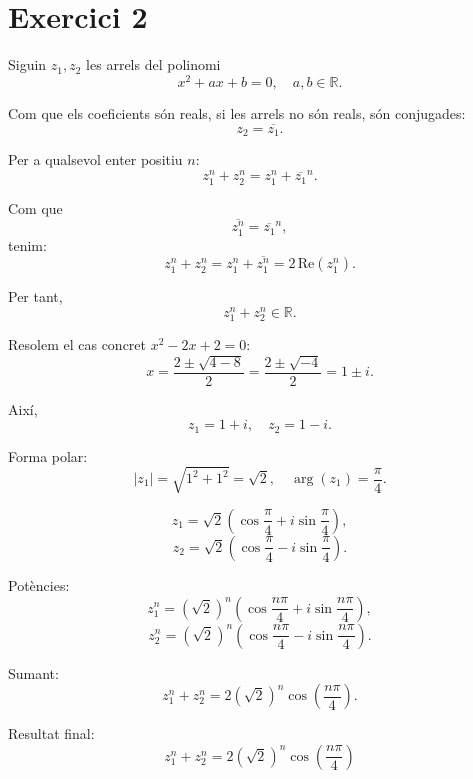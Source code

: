 \section{Exercici 2}
Siguin $z_1, z_2$ les arrels del polinomi
\[
x^2 + ax + b = 0, \quad a,b \in \mathbb{R}.
\]

Com que els coeficients són reals, si les arrels no són reals, són conjugades:
\[
z_2 = \overline{z_1}.
\]

Per a qualsevol enter positiu $n$:
\[
z_1^n + z_2^n = z_1^n + \overline{z_1}^n.
\]

Com que
\[
\overline{z_1^n} = \overline{z_1}^n,
\]
tenim:
\[
z_1^n + z_2^n = z_1^n + \overline{z_1^n} = 2 \,\mathrm{Re}(z_1^n).
\]

Per tant,
\[
z_1^n + z_2^n \in \mathbb{R}.
\]

Resolem el cas concret $x^2 - 2x + 2 = 0$:
\[
x = \frac{2 \pm \sqrt{4 - 8}}{2} = \frac{2 \pm \sqrt{-4}}{2} = 1 \pm i.
\]

Així,
\[
z_1 = 1+i, \quad z_2 = 1-i.
\]

Forma polar:
\[
|z_1| = \sqrt{1^2 + 1^2} = \sqrt{2}, \quad \arg(z_1) = \frac{\pi}{4}.
\]

\[
z_1 = \sqrt{2}\left(\cos \frac{\pi}{4} + i \sin \frac{\pi}{4}\right),
\]
\[
z_2 = \sqrt{2}\left(\cos \frac{\pi}{4} - i \sin \frac{\pi}{4}\right).
\]

Potències:
\[
z_1^n = (\sqrt{2})^n \left(\cos \frac{n\pi}{4} + i \sin \frac{n\pi}{4}\right),
\]
\[
z_2^n = (\sqrt{2})^n \left(\cos \frac{n\pi}{4} - i \sin \frac{n\pi}{4}\right).
\]

Sumant:
\[
z_1^n + z_2^n = 2(\sqrt{2})^n \cos\left(\frac{n\pi}{4}\right).
\]

Resultat final:
\[
\boxed{
z_1^n + z_2^n = 2(\sqrt{2})^n \cos\left(\frac{n\pi}{4}\right)
}
\]